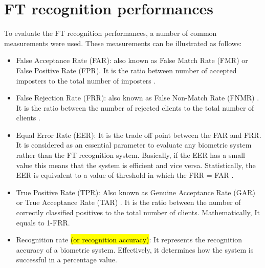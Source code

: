 \documentclass[review]{elsarticle}
\begin{document}
\section{FT recognition performances}
	To evaluate the FT recognition performances, a number of common measurements were used. These measurements can be illustrated as follows:
	\begin{itemize}
		\item False Acceptance Rate (FAR): also known as False Match Rate (FMR) or False Positive Rate (FPR)\cite{Woods1997Generating,saugirouglu2009Intelligent}. It is the ratio between number of accepted imposters to the total number of imposters \cite{Goh2010Bi-modal}. 
		\item False Rejection Rate (FRR): also known as False Non-Match Rate (FNMR) \cite{Woods1997Generating} \cite{saugirouglu2009Intelligent}. It is the ratio between the number of rejected clients to the total number of clients \cite{Goh2010Bi-modal}. 
		\item Equal Error Rate (EER): It is the trade off point between the FAR and FRR. It is considered as an essential parameter to evaluate any biometric system rather than the FT recognition system. Basically, if the EER has a small value this means that the system is efficient and vice versa. Statistically, the EER is equivalent to a value of threshold in which the FRR = FAR \cite{meshoul2010novel}.
		\item True Positive Rate (TPR): Also known as Genuine Acceptance Rate (GAR) \cite{Woods1997Generating} \cite{saugirouglu2009Intelligent} or True Acceptance Rate (TAR) \cite{Debayan2018matching}. It is the ratio between the number of correctly classified positives to the total number of clients. Mathematically, It equals to 1-FRR. 
		\item Recognition rate \hl{(or recognition accuracy)}: It represents the recognition accuracy of a biometric system. Effectively, it determines how the system is successful in a percentage value.

\end{itemize}
\end{document}
